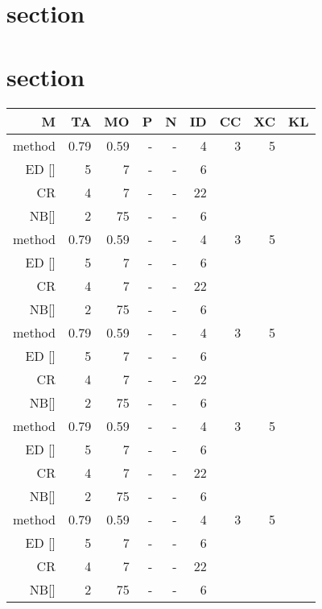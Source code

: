\documentclass[twocolumn]{article}
\begin{document}
\section{section}

\Blindtext[3]

\section{section}
\Blindtext[2]

\begin {table*}[tp]
\begin{tabular*}{\textwidth}{@{\hskip 6pt\extracolsep{\stretch{1}}}*{9}{r}}
\hline
M       & TA    & MO    & P & N & ID & CC & XC & KL \\
\hline
method  & 0.79  & 0.59  & - & - & 4  & 3  & 5  &    \\
ED  []  & 5     & 7     & - & - & 6  &    &    &    \\
CR      & 4     & 7     & - & - & 22 &    &    &    \\
NB[]    & 2     & 75    & - & - & 6  &    &    &    \\
method  & 0.79  & 0.59  & - & - & 4  & 3  & 5  &    \\
ED  []  & 5     & 7     & - & - & 6  &    &    &    \\
CR      & 4     & 7     & - & - & 22 &    &    &    \\
NB[]    & 2     & 75    & - & - & 6  &    &    &    \\
method  & 0.79  & 0.59  & - & - & 4  & 3  & 5  &    \\
ED  []  & 5     & 7     & - & - & 6  &    &    &    \\
CR      & 4     & 7     & - & - & 22 &    &    &    \\
NB[]    & 2     & 75    & - & - & 6  &    &    &    \\
method  & 0.79  & 0.59  & - & - & 4  & 3  & 5  &    \\
ED  []  & 5     & 7     & - & - & 6  &    &    &    \\
CR      & 4     & 7     & - & - & 22 &    &    &    \\
NB[]    & 2     & 75    & - & - & 6  &    &    &    \\
method  & 0.79  & 0.59  & - & - & 4  & 3  & 5  &    \\
ED  []  & 5     & 7     & - & - & 6  &    &    &    \\
CR      & 4     & 7     & - & - & 22 &    &    &    \\
NB[]    & 2     & 75    & - & - & 6  &    &    &    \\

\end{tabular*}
\end{table*}
\end{document}
